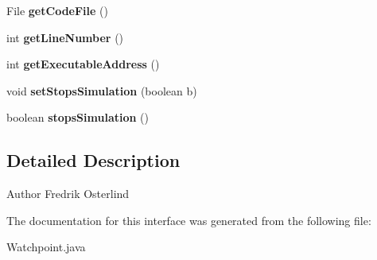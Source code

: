 \begin{DoxyCompactItemize}
\item 
\hypertarget{interfaceorg_1_1contikios_1_1cooja_1_1Watchpoint_ab6ccaff743ab6775e51d88c9a06fb120}{File {\bfseries get\-Code\-File} ()}\label{interfaceorg_1_1contikios_1_1cooja_1_1Watchpoint_ab6ccaff743ab6775e51d88c9a06fb120}

\item 
\hypertarget{interfaceorg_1_1contikios_1_1cooja_1_1Watchpoint_ab646e1a6f6783b1e7ed284a611caa4a7}{int {\bfseries get\-Line\-Number} ()}\label{interfaceorg_1_1contikios_1_1cooja_1_1Watchpoint_ab646e1a6f6783b1e7ed284a611caa4a7}

\item 
\hypertarget{interfaceorg_1_1contikios_1_1cooja_1_1Watchpoint_a7f721680839841d479e2783fbe8c6268}{int {\bfseries get\-Executable\-Address} ()}\label{interfaceorg_1_1contikios_1_1cooja_1_1Watchpoint_a7f721680839841d479e2783fbe8c6268}

\item 
\hypertarget{interfaceorg_1_1contikios_1_1cooja_1_1Watchpoint_a0526ee450f11d884f4d21e6ea5f6d560}{void {\bfseries set\-Stops\-Simulation} (boolean b)}\label{interfaceorg_1_1contikios_1_1cooja_1_1Watchpoint_a0526ee450f11d884f4d21e6ea5f6d560}

\item 
\hypertarget{interfaceorg_1_1contikios_1_1cooja_1_1Watchpoint_ac0579bce86f45786c149702f7e1a423d}{boolean {\bfseries stops\-Simulation} ()}\label{interfaceorg_1_1contikios_1_1cooja_1_1Watchpoint_ac0579bce86f45786c149702f7e1a423d}

\end{DoxyCompactItemize}


\subsection{Detailed Description}
\begin{DoxyAuthor}{Author}
Fredrik Osterlind 
\end{DoxyAuthor}


The documentation for this interface was generated from the following file\-:\begin{DoxyCompactItemize}
\item 
Watchpoint.\-java\end{DoxyCompactItemize}
